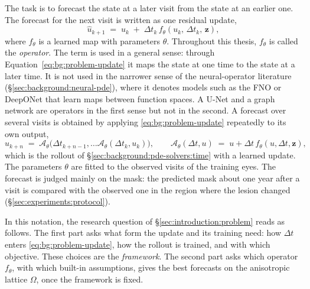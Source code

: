 The task is to forecast the state at a later visit from the state at an
earlier one. The forecast for the next visit is written as one residual
update,
\begin{equation}
  \hat u_{k+1} \;=\; u_k \;+\; \Delta t_k \, f_\theta\!\left(u_k,\, \Delta t_k,\, \mathbf{z}\right),
  \label{eq:bg:problem-update}
\end{equation}
where $f_\theta$ is a learned map with parameters $\theta$. Throughout this
thesis, $f_\theta$ is called the \emph{operator}. The term is used in a
general sense: through Equation~\eqref{eq:bg:problem-update} it maps the
state at one time to the state at a later time. It is not used in the narrower sense of the neural-operator
literature (\S\ref{sec:background:neural-pde}), where it denotes models
such as the FNO or DeepONet that learn maps between function spaces. A
U-Net and a graph network are operators in the first sense but not in the
second. A forecast over several visits is obtained by applying
\eqref{eq:bg:problem-update} repeatedly to its own output,
\begin{equation*}
  \hat u_{k+n} \;=\; \mathcal{A}_\theta\bigl(\Delta t_{k+n-1}, \dots
  \mathcal{A}_\theta(\Delta t_k, u_k)\bigr), \qquad
  \mathcal{A}_\theta(\Delta t, u) \;=\; u + \Delta t \, f_\theta(u, \Delta t, \mathbf{z}),
\end{equation*}
which is the rollout of \S\ref{sec:background:pde-solvers:time} with a
learned update. The parameters $\theta$ are fitted to the observed visits
of the training eyes. The forecast is judged mainly on the mask: the
predicted mask about one year after a visit is compared with the observed
one in the region where the lesion changed
(\S\ref{sec:experiments:protocol}).

In this notation, the research question of \S\ref{sec:introduction:problem}
reads as follows. The first part asks what form the update and its training
need: how $\Delta t$ enters \eqref{eq:bg:problem-update}, how the rollout
is trained, and with which objective. These choices are the
\emph{framework}. The second part asks which operator $f_\theta$, with
which built-in assumptions, gives the best forecasts on the anisotropic
lattice $\Omega$, once the framework is fixed.





